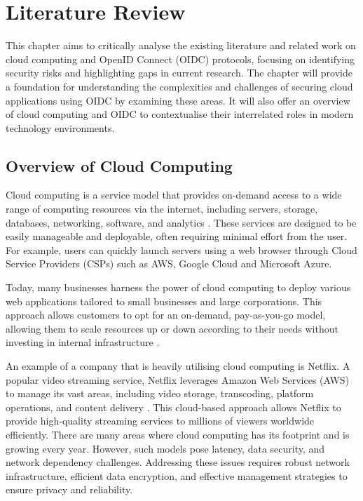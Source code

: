 \chapter{Literature Review}

This chapter aims to critically analyse the existing literature and related work on cloud computing and OpenID Connect (OIDC) protocols, focusing on identifying security risks and highlighting gaps in current research. The chapter will provide a foundation for understanding the complexities and challenges of securing cloud applications using OIDC by examining these areas. It will also offer an overview of cloud computing and OIDC to contextualise their interrelated roles in modern technology environments.

\section{Overview of Cloud Computing}
Cloud computing is a service model that provides on-demand access to a wide range of computing resources via the internet, including servers, storage, databases, networking, software, and analytics \citep{rashid2019cloud}. These services are designed to be easily manageable and deployable, often requiring minimal effort from the user. For example, users can quickly launch servers using a web browser through Cloud Service Providers (CSPs) such as AWS, Google Cloud and Microsoft Azure. 

Today, many businesses harness the power of cloud computing to deploy various web applications tailored to small businesses and large corporations. This approach allows customers to opt for an on-demand, pay-as-you-go model, allowing them to scale resources up or down according to their needs without investing in internal infrastructure \citep{cloud_comp_example}.

An example of a company that is heavily utilising cloud computing is Netflix. A popular video streaming service, Netflix leverages Amazon Web Services (AWS) to manage its vast areas, including video storage, transcoding, platform operations, and content delivery \citep{cloud_netflix}. This cloud-based approach allows Netflix to provide high-quality streaming services to millions of viewers worldwide efficiently. There are many areas where cloud computing has its footprint and is growing every year. However, such models pose latency, data security, and network dependency challenges. Addressing these issues requires robust network infrastructure, efficient data encryption, and effective management strategies to ensure privacy and reliability.

